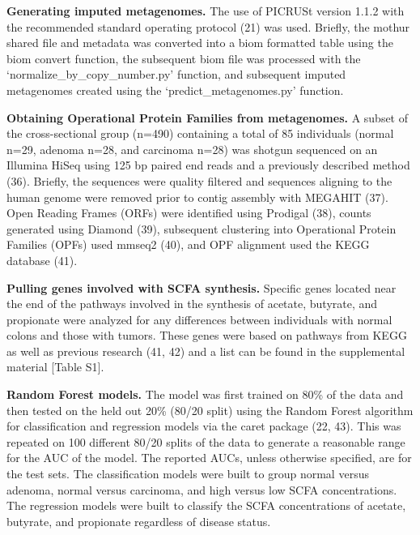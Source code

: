 \documentclass[11pt,]{article}
\begin{document}
\textbf{Generating imputed metagenomes.} The use of PICRUSt version
1.1.2 with the recommended standard operating protocol (21) was used.
Briefly, the mothur shared file and metadata was converted into a biom
formatted table using the biom convert function, the subsequent biom
file was processed with the `normalize\_by\_copy\_number.py' function,
and subsequent imputed metagenomes created using the
`predict\_metagenomes.py' function.

\textbf{Obtaining Operational Protein Families from metagenomes.} A
subset of the cross-sectional group (n=490) containing a total of 85
individuals (normal n=29, adenoma n=28, and carcinoma n=28) was shotgun
sequenced on an Illumina HiSeq using 125 bp paired end reads and a
previously described method (36). Briefly, the sequences were quality
filtered and sequences aligning to the human genome were removed prior
to contig assembly with MEGAHIT (37). Open Reading Frames (ORFs) were
identified using Prodigal (38), counts generated using Diamond (39),
subsequent clustering into Operational Protein Families (OPFs) used
mmseq2 (40), and OPF alignment used the KEGG database (41).

\textbf{Pulling genes involved with SCFA synthesis.} Specific genes
located near the end of the pathways involved in the synthesis of
acetate, butyrate, and propionate were analyzed for any differences
between individuals with normal colons and those with tumors. These
genes were based on pathways from KEGG as well as previous research (41,
42) and a list can be found in the supplemental material {[}Table S1{]}.

\textbf{Random Forest models.} The model was first trained on 80\% of
the data and then tested on the held out 20\% (80/20 split) using the
Random Forest algorithm for classification and regression models via the
caret package (22, 43). This was repeated on 100 different 80/20 splits
of the data to generate a reasonable range for the AUC of the model. The
reported AUCs, unless otherwise specified, are for the test sets. The
classification models were built to group normal versus adenoma, normal
versus carcinoma, and high versus low SCFA concentrations. The
regression models were built to classify the SCFA concentrations of
acetate, butyrate, and propionate regardless of disease status.
\end{document}
